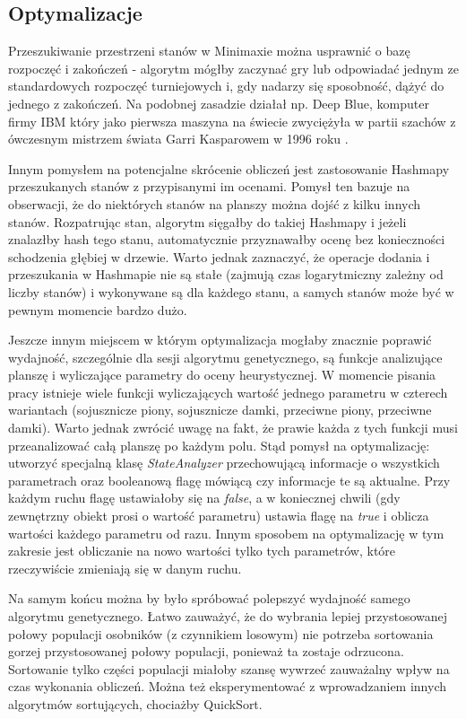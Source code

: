 \subsection{Optymalizacje}

Przeszukiwanie przestrzeni stanów w Minimaxie można usprawnić o bazę rozpoczęć i zakończeń - algorytm mógłby zaczynać gry lub odpowiadać jednym ze standardowych rozpoczęć turniejowych i, gdy nadarzy się sposobność, dążyć do jednego z zakończeń. Na podobnej zasadzie działał np. Deep Blue, komputer firmy IBM który jako pierwsza maszyna na świecie zwyciężyła w partii szachów z ówczesnym mistrzem świata Garri Kasparowem w 1996 roku \cite{RBA-SI}.

Innym pomysłem na potencjalne skrócenie obliczeń jest zastosowanie Hashmapy przeszukanych stanów z przypisanymi im ocenami. Pomysł ten bazuje na obserwacji, że do niektórych stanów na planszy można dojść z kilku innych stanów. Rozpatrując stan, algorytm sięgałby do takiej Hashmapy i jeżeli znalazłby hash tego stanu, automatycznie przyznawałby ocenę bez konieczności schodzenia głębiej w drzewie. Warto jednak zaznaczyć, że operacje dodania i przeszukania w Hashmapie nie są stałe (zajmują czas logarytmiczny zależny od liczby stanów) i wykonywane są dla każdego stanu, a samych stanów może być w pewnym momencie bardzo dużo.

Jeszcze innym miejscem w którym optymalizacja mogłaby znacznie poprawić wydajność, szczególnie dla sesji algorytmu genetycznego, są funkcje analizujące planszę i wyliczające parametry do oceny heurystycznej. W momencie pisania pracy istnieje wiele funkcji wyliczających wartość jednego parametru w czterech wariantach (sojusznicze piony, sojusznicze damki, przeciwne piony, przeciwne damki). Warto jednak zwrócić uwagę na fakt, że prawie każda z tych funkcji musi przeanalizować całą planszę po każdym polu. Stąd pomysł na optymalizację: utworzyć specjalną klasę \textit{StateAnalyzer} przechowującą informacje o wszystkich parametrach oraz booleanową flagę mówiącą czy informacje te są aktualne. Przy każdym ruchu flagę ustawiałoby się na \textit{false}, a w koniecznej chwili (gdy zewnętrzny obiekt prosi o wartość parametru) ustawia flagę na \textit{true} i oblicza wartości każdego parametru od razu. Innym sposobem na optymalizację w tym zakresie jest obliczanie na nowo wartości tylko tych parametrów, które rzeczywiście zmieniają się w danym ruchu.

Na samym końcu można by było spróbować polepszyć wydajność samego algorytmu genetycznego. Łatwo zauważyć, że do wybrania lepiej przystosowanej połowy populacji osobników (z czynnikiem losowym) nie potrzeba sortowania gorzej przystosowanej połowy populacji, ponieważ ta zostaje odrzucona. Sortowanie tylko części populacji miałoby szansę wywrzeć zauważalny wpływ na czas wykonania obliczeń. Można też eksperymentować z wprowadzaniem innych algorytmów sortujących, chociażby QuickSort.

